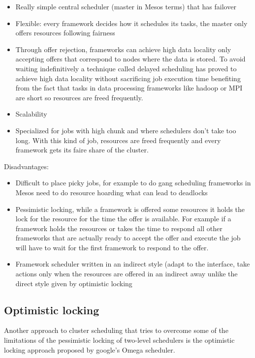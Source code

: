 \documentclass{svjour3}                     %
\begin{document}
\begin{itemize}
  \item
  Really simple central scheduler (master in Mesos terms) that has
  failover 
 \item
  Flexible: every framework decides how it schedules its tasks, the
  master only offers resources following fairness 
 \item
  Through offer rejection, frameworks can achieve high data locality
  only accepting offers that correspond to nodes where the data is
  stored. To avoid waiting indefinitively a technique called delayed
  scheduling \cite{zaharia_delay_2010} has proved to achieve high data locality without
  sacrificing job execution time benefiting from the fact that tasks in
  data processing frameworks like hadoop or MPI are short so resources
  are freed frequently.
 \item Scalability
 \item Specialized for jobs with high chunk and where schedulers don't take
too long. With this kind of job, resources are freed frequently and
every framework gets its faire share of the cluster.
\end{itemize}

Disadvantages:

\begin{itemize}
 \item Difficult to place picky jobs, for example to do gang scheduling
frameworks in Mesos need to do resource hoarding what can lead to
deadlocks
 \item Pessimistic locking, while a framework is offered some resources it
holds the lock for the resource for the time the offer is
available. For example if a framework holds the resources or takes the
time to respond all other frameworks that are actually ready to accept
the offer and execute the job will have to wait for the first
framework to respond to the offer.
 \item Framework scheduler written in an indirect style (adapt to the interface, 
  take actions only when the resources are offered in an indirect away unlike
  the direct style given by optimistic locking
\end{itemize}

\subsection{Optimistic locking}

Another approach to cluster scheduling that tries to overcome some of
the limitations of the pessimistic locking of two-level schedulers is
the optimistic locking approach proposed by google's Omega
scheduler.
\end{document}
